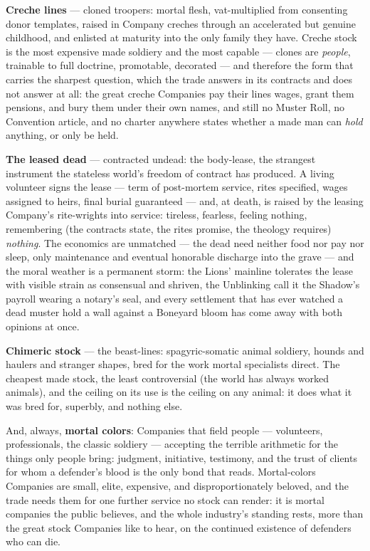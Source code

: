 \textbf{Creche lines} --- cloned troopers: mortal flesh, vat-multiplied from consenting donor templates, raised in Company creches through an accelerated but genuine childhood, and enlisted at maturity into the only family they have. Creche stock is the most expensive made soldiery and the most capable --- clones are \textit{people}, trainable to full doctrine, promotable, decorated --- and therefore the form that carries the sharpest question, which the trade answers in its contracts and does not answer at all: the great creche Companies pay their lines wages, grant them pensions, and bury them under their own names, and still no Muster Roll, no Convention article, and no charter anywhere states whether a made man can \textit{hold} anything, or only be held.

\textbf{The leased dead} --- contracted undead: the body-lease, the strangest instrument the stateless world's freedom of contract has produced. A living volunteer signs the lease --- term of post-mortem service, rites specified, wages assigned to heirs, final burial guaranteed --- and, at death, is raised by the leasing Company's rite-wrights into service: tireless, fearless, feeling nothing, remembering (the contracts state, the rites promise, the theology requires) \textit{nothing}. The economics are unmatched --- the dead need neither food nor pay nor sleep, only maintenance and eventual honorable discharge into the grave --- and the moral weather is a permanent storm: the Lions' mainline tolerates the lease with visible strain as consensual and shriven, the Unblinking call it the Shadow's payroll wearing a notary's seal, and every settlement that has ever watched a dead muster hold a wall against a Boneyard bloom has come away with both opinions at once.

\textbf{Chimeric stock} --- the beast-lines: spagyric-somatic animal soldiery, hounds and haulers and stranger shapes, bred for the work mortal specialists direct. The cheapest made stock, the least controversial (the world has always worked animals), and the ceiling on its use is the ceiling on any animal: it does what it was bred for, superbly, and nothing else.

And, always, \textbf{mortal colors}: Companies that field people --- volunteers, professionals, the classic soldiery --- accepting the terrible arithmetic for the things only people bring: judgment, initiative, testimony, and the trust of clients for whom a defender's blood is the only bond that reads. Mortal-colors Companies are small, elite, expensive, and disproportionately beloved, and the trade needs them for one further service no stock can render: it is mortal companies the public believes, and the whole industry's standing rests, more than the great stock Companies like to hear, on the continued existence of defenders who can die.

